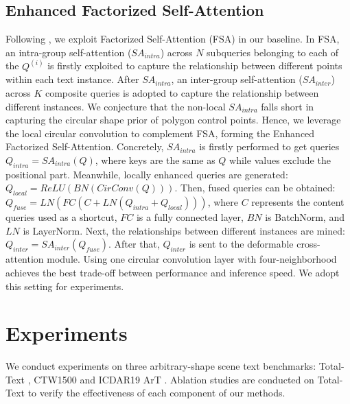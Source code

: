 \documentclass[letterpaper]{article} \usepackage{aaai23}  \usepackage{times}  \usepackage{helvet}  \usepackage{courier}  \usepackage[hyphens]{url}  \usepackage{graphicx} \urlstyle{rm}
\begin{document}
\subsection{Enhanced Factorized Self-Attention}
Following \cite{zhang2022text}, we exploit Factorized Self-Attention (FSA) \cite{dong2021visual} in our baseline. In FSA, an intra-group self-attention ($SA_{intra}$) across $N$ subqueries belonging to each of the $Q^{(i)}$ is firstly exploited to capture the relationship between different points within each text instance. After $SA_{intra}$, an inter-group self-attention ($SA_{inter}$) across $K$ composite queries is adopted to capture the relationship between different instances. We conjecture that the non-local $SA_{intra}$ falls short in capturing the circular shape prior of polygon control points. Hence, we leverage the local circular convolution \cite{peng2020deep} to complement FSA, forming the Enhanced Factorized Self-Attention. Concretely, $SA_{intra}$ is firstly performed to get queries $Q_{intra} = SA_{intra}(Q)$, where keys are the same as $Q$ while values exclude the positional part. Meanwhile, locally enhanced queries are generated: $Q_{local} = ReLU(BN(CirConv(Q)))$. Then, fused queries can be obtained: $Q_{fuse} = LN(FC(C + LN(Q_{intra} + Q_{local})))$, where $C$ represents the content queries used as a shortcut, $FC$ is a fully connected layer, $BN$ is BatchNorm, and $LN$ is LayerNorm. Next, the relationships between different instances are mined: $Q_{inter} = SA_{inter}(Q_{fuse})$. After that, $Q_{inter}$ is sent to the deformable cross-attention module. Using one circular convolution layer with four-neighborhood achieves the best trade-off between performance and inference speed. We adopt this setting for experiments.



\section{Experiments}
\label{sec:exp}
We conduct experiments on three arbitrary-shape scene text benchmarks: Total-Text \cite{ch2020total}, CTW1500 \cite{liu2019curved} and ICDAR19 ArT \cite{chng2019icdar2019}. Ablation studies are conducted on Total-Text to verify the effectiveness of each component of our methods.
\end{document}
